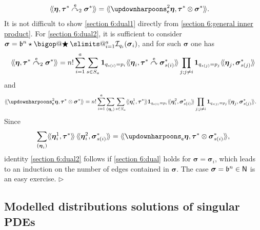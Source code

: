 \documentclass[10pt, reqno]{amsart}
\makeatletter
\numberwithin{subsection}{section}
\numberwithin{subsubsection}{subsection}
\numberwithin{equation}{section} %
\newenvironment{Dem}[1][\unskip]{%
    \begin{list}{\hspace{1.15cm}{\sf \textbf{{\small Proof #1 --}}}}{%
        \setlength{\topsep}{0pt}%
        \setlength{\leftmargin}{0pt}%
        \setlength{\rightmargin}{0pt}%
        \setlength{\listparindent}{0pt}%
        \setlength{\itemindent}{0pt}%
        \setlength{\parsep}{0pt}%
        \addtolength{\leftmargin}{0pt}%
        \addtolength{\rightmargin}{0pt}%
    } \item }{\hfill $\rhd$\end{list}\smallskip}
\theoremstyle{mystyle}
\theoremstyle{mystyle2}
\theoremstyle{mystyle3}
\DeclareRobustCommand\bigop[1]{%
  \mathop{\vphantom{\sum}\mathpalette\bigop@{#1}}\slimits@
}
\newcommand{\bigop@}[2]{%
  \vcenter{%
    \sbox\z@{$#1\sum$}%
    \hbox{\resizebox{\ifx#1\displaystyle.9\fi\dimexpr\ht\z@+\dp\z@}{!}{$\m@th#2$}}%
  }%
}
\newcommand{\Bigstar}{\DOTSB\bigop{\bigstar}}
\newcommand{\bstau}{\boldsymbol{\tau}}
\newcommand{\bssigma}{\boldsymbol{\sigma}}
\newcommand{\bseta}{\boldsymbol{\eta}}
\newcommand{\wangle}[1]{\langle\!\langle#1\rangle\!\rangle}
\newcommand{\grafting}{\overset{\sf e}{\curvearrowright}}
\newcommand{\nonrootgrafting}{\overset{\sf e}{\curvearrowright}_2}
\newcommand{\mcI}{\mathcal{I}}
\makeatother
\begin{document}
\begin{Dem}
\begin{align}
\label{section 6:dual2}\wangle{\bseta, \bstau^*\nonrootgrafting\bssigma^*} 
&= \wangle{\updownharpoons_{\sf e}^2\bseta, \bstau^*\otimes\bssigma^*}.
\end{align}
It is not difficult to show \eqref{section 6:dual1} directly from \eqref{section 6:general inner product}. For \eqref{section 6:dual2}, it is sufficient to consider $\bssigma = \frak{b}^n\star\Bigstar_{i=1}^a\mcI_{q_i}(\bssigma_i)$, and for such $\bssigma$ one has
\begin{align*}
\wangle{\bseta, \bstau^*\nonrootgrafting\bssigma^*}
= n! \sum_{i=1}^a\sum_{s\in S_a}{\bf1}_{q_{s(i)}=p_i}
\wangle{\bseta_i, \bstau^*\grafting\bssigma_{s(i)}^*}
\prod_{j;j\neq i}{\bf1}_{q_{s(j)}=p_j}\wangle{\bseta_j, \bssigma_{s(j)}^*}
\end{align*}
and
\begin{align*}
\wangle{\updownharpoons_{\sf e}^2\bseta, \bstau^*\otimes\bssigma^*}
&= n! \sum_{i=1}^a\sum_{(\bseta_i)}\sum_{s\in S_a}\wangle{\bseta_i^1, \bstau^*}
{\bf1}_{q_{s(i)}=p_i} \wangle{\bseta_i^2, \bssigma_{s(i)}^*}
\prod_{j;j\neq i}{\bf1}_{q_{s(j)}=p_j}\wangle{\bseta_j, \bssigma_{s(j)}^*}.
\end{align*}
Since 
$$
\sum_{(\bseta_i)}\wangle{\bseta_i^1, \bstau^*} \,\wangle{\bseta_i^2, \bssigma_{s(i)}^*} 
= \wangle{\updownharpoons_{\sf e}\bseta, \bstau^*\otimes\bssigma_{s(i)}^*},
$$ 
identity \eqref{section 6:dual2} follows if \eqref{section 6:dual} holds for $\bssigma=\bssigma_i$, which leads to an induction on the number of edges contained in $\bssigma$. The case $\bssigma=\frak{b}^n\in{\sf N}$ is an easy exercise.
\end{Dem}



\bigskip



\subsection{Modelled distributions solutions of singular PDEs}
\label{SectionCoherence}
\end{document}
